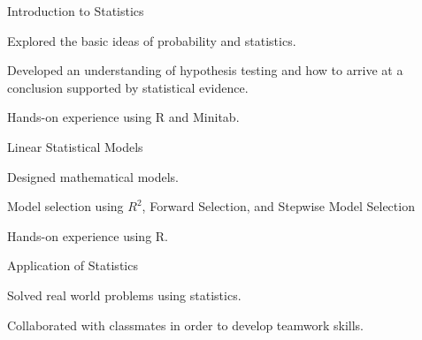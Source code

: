 

\begin{cventries}

  \cventry
    {Introduction to Statistics} %
    {} %
    {} %
    {} %
    {
    \begin{cvitems}
    \item Explored the basic ideas of probability and statistics.
    \item Developed an understanding of hypothesis testing and how to arrive at a conclusion supported by statistical evidence.
    \item Hands-on experience using R and Minitab.
    \end{cvitems}
    }

  \cventry
    {Linear Statistical Models} %
    {} %
    {} %
    {} %
    {
      \begin{cvitems}
      \item Designed mathematical models.
      \item Model selection using $R^2$, Forward Selection, and Stepwise Model Selection
      \item Hands-on experience using R.
      \end{cvitems}
    }

      \cventry
    {Application of Statistics} %
    {} %
    {} %
    {} %
    {
      \begin{cvitems}
      \item Solved real world problems using statistics.
        \item Collaborated with classmates in order to develop teamwork skills.
      \end{cvitems}
    }
\end{cventries}
